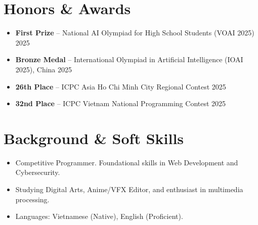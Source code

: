 \documentclass[11pt,a4paper]{article}
\begin{document}
\section{Honors \& Awards}
\begin{itemize}[leftmargin=*, parsep=0pt, itemsep=2pt, topsep=2pt]
    \item \textbf{First Prize} -- National AI Olympiad for High School Students (VOAI 2025) \hfill 2025
    \item \textbf{Bronze Medal} -- International Olympiad in Artificial Intelligence (IOAI 2025), China \hfill 2025
    \item \textbf{26th Place} -- ICPC Asia Ho Chi Minh City Regional Contest \hfill 2025
    \item \textbf{32nd Place} -- ICPC Vietnam National Programming Contest \hfill 2025
\end{itemize}

\section{Background \& Soft Skills}
\begin{itemize}[leftmargin=*, parsep=0pt, itemsep=2pt, topsep=2pt]
    \item Competitive Programmer. Foundational skills in Web Development and Cybersecurity.
    \item Studying Digital Arts, Anime/VFX Editor, and enthusiast in multimedia processing. 
    \item Languages: Vietnamese (Native), English (Proficient).
\end{itemize}
\end{document}
